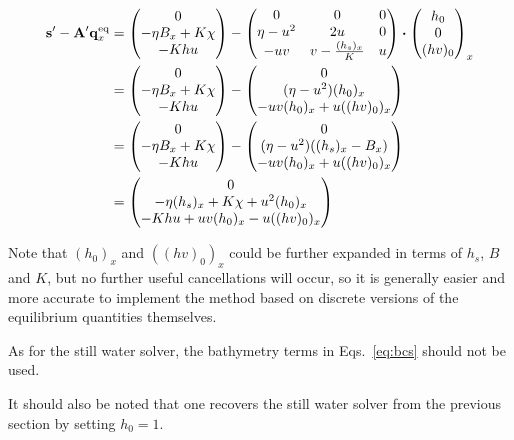 \begin{align}
  \vb s' - \vb A' \eq{\vb q}_x
  &= \mqty(0 \\ -\eta B_x + K \chi \\ - K h u) - \mqty(
    0 & 0 & 0 \\
    \eta - u^2 & 2u & 0 \\
    -uv & v - \frac{(h_s)_x}{K} & u
  ) \vdot \mqty(h_0 \\ 0 \\ (hv)_0)_x \\
  &= \mqty(0 \\ -\eta B_x + K \chi \\ - K h u) - \mqty(
    0 \\
    (\eta - u^2)(h_0)_x \\
    -uv(h_0)_x + u((hv)_0)_x
  ) \\
  &= \mqty(0 \\ -\eta B_x + K \chi \\ - K h u) - \mqty(
    0 \\
    (\eta - u^2)((h_s)_x - B_x) \\
    -uv(h_0)_x + u((hv)_0)_x
  ) \\
  &= \mqty(0 \\ -\eta (h_s)_x + K \chi + u^2 (h_0)_x \\ - K h u +uv(h_0)_x - u((hv)_0)_x)
\end{align}

Note that $(h_0)_x$ and $((hv)_0)_x$ could be further expanded in terms of $h_s$, $B$ and $K$, but no further useful cancellations will occur, so it is generally easier and more accurate to implement the method based on discrete versions of the equilibrium quantities themselves.

As for the still water solver, the bathymetry terms in Eqs.~\ref{eq:bcs} should not be used.

It should also be noted that one recovers the still water solver from the previous section by setting $h_0 = 1$.

